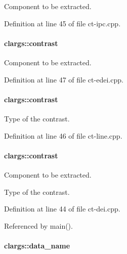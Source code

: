 Component to be extracted. 



Definition at line 45 of file ct-\/ipc.cpp.

\hypertarget{structclargs_a71dfcd38ac63faa44de57ebfd34bac17}{
\paragraph[{contrast}]{ {\bf clargs::contrast}}\hfill}
\label{structclargs_a71dfcd38ac63faa44de57ebfd34bac17}


Component to be extracted. 



Definition at line 47 of file ct-\/edei.cpp.

\hypertarget{structclargs_a935d211849fe10f5717d628608bbd4e3}{
\paragraph[{contrast}]{ {\bf clargs::contrast}}\hfill}
\label{structclargs_a935d211849fe10f5717d628608bbd4e3}


Type of the contrast. 



Definition at line 46 of file ct-\/line.cpp.

\hypertarget{structclargs_a935d211849fe10f5717d628608bbd4e3}{
\paragraph[{contrast}]{ {\bf clargs::contrast}}\hfill}
\label{structclargs_a935d211849fe10f5717d628608bbd4e3}


Component to be extracted. 

Type of the contrast. 

Definition at line 44 of file ct-\/dei.cpp.



Referenced by main().

\hypertarget{structclargs_ab05d4de1dd5a1ce90e0af6948ded13b4}{
\paragraph[{data\_\-name}]{ {\bf clargs::data\_\-name}}\hfill}
\label{structclargs_ab05d4de1dd5a1ce90e0af6948ded13b4}


